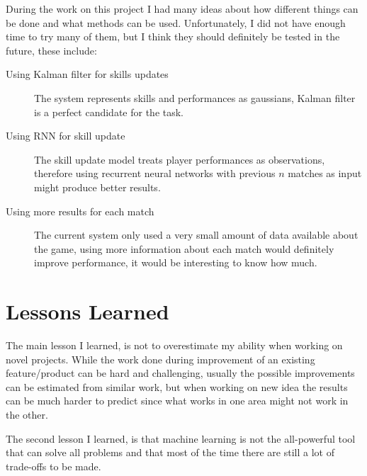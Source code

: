 \documentclass[12pt,a4paper]{book}
\begin{document}
During the work on this project I had many ideas about how different things can be done and what methods can be used.
Unfortunately, I did not have enough time to try many of them, but I think they should definitely be tested in the future, these include:
\begin{description}
\item[Using Kalman filter for skills updates]
The system represents skills and performances as gaussians, Kalman filter is a perfect candidate for the task.

\item[Using RNN for skill update]
The skill update model treats player performances as observations, therefore using recurrent neural networks with previous $n$ matches as input might produce better results.

\item[Using more results for each match]
The current system only used a very small amount of data available about the game, using more information about each match would definitely improve performance, it would be interesting to know how much.
\end{description}
\section{Lessons Learned}
The main lesson I learned, is not to overestimate my ability when working on novel projects.
While the work done during improvement of an existing feature/product can be hard and challenging, usually the possible improvements can be estimated from similar work, but when working on new idea the results can be much harder to predict since what works in one area might not work in the other.

The second lesson I learned, is that machine learning is not the all-powerful tool that can solve all problems and that most of the time there are still a lot of trade-offs to be made.

\printbibliography[heading=bibintoc,title={Bibliography}]

\appendix
\end{document}

